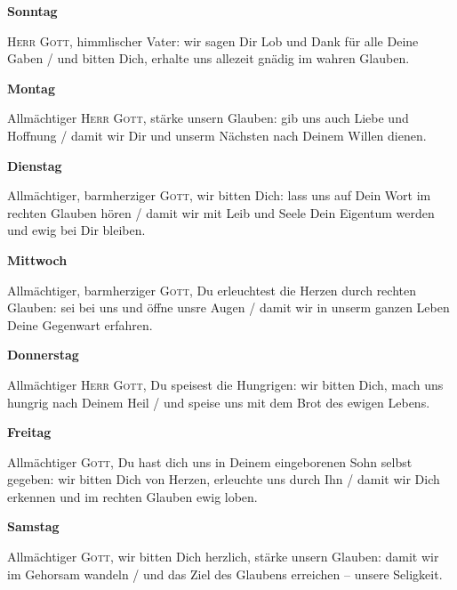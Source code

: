 \begin{multicols}{2}\setlength{\columnseprule}{0.2pt}
\textbf{Sonntag}\par
 \textsc{Herr} \textsc{Gott}, himmlischer Vater: wir sagen Dir Lob und Dank für alle Deine Gaben / und bitten Dich, erhalte uns allezeit gnädig im wahren Glauben. \par
 \textbf{Montag}\par
 Allmächtiger \textsc{Herr} \textsc{Gott}, stärke unsern Glauben: gib uns auch Liebe und Hoffnung / damit wir Dir und unserm Nächsten nach Deinem Willen dienen. \par
 \textbf{Dienstag}\par
 Allmächtiger, barmherziger \textsc{Gott}, wir bitten Dich: lass uns auf Dein Wort im rechten Glauben hören / damit wir mit Leib und Seele Dein Eigentum werden und ewig bei Dir bleiben. \par
 \textbf{Mittwoch}\par
 Allmächtiger, barmherziger \textsc{Gott}, Du erleuchtest die Herzen durch rechten Glauben: sei bei uns und öffne unsre Augen / damit wir in unserm ganzen Leben Deine Gegenwart erfahren. \par
 \textbf{Donnerstag}\par
 Allmächtiger \textsc{Herr} \textsc{Gott}, Du speisest die Hungrigen: wir bitten Dich, mach uns hungrig nach Deinem Heil / und speise uns mit dem Brot des ewigen Lebens. \par
 \textbf{Freitag}\par
 Allmächtiger \textsc{Gott}, Du hast dich uns in Deinem eingeborenen Sohn selbst gegeben: wir bitten Dich von Herzen, erleuchte uns durch Ihn / damit wir Dich erkennen und im rechten Glauben ewig loben. \par
 \textbf{Samstag}\par
 Allmächtiger \textsc{Gott}, wir bitten Dich herzlich, stärke unsern Glauben: damit wir im Gehorsam wandeln / und das Ziel des Glaubens erreichen -- unsere Seligkeit. \par
\end{multicols}
